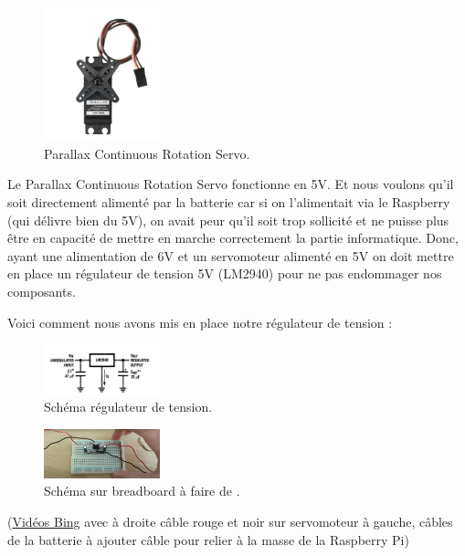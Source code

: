 \documentclass[a4paper,12pt]{report}  %
\begin{document}
\begin{figure}[H]
	\centering
	\includegraphics[width=0.3\textwidth]{./attachments/moteur_rotation.jpg}
	\caption{Parallax Continuous Rotation Servo.}
\end{figure}

Le Parallax Continuous Rotation Servo fonctionne en 5V. Et nous voulons qu’il soit directement alimenté par la batterie car si on l'alimentait via le Raspberry (qui délivre bien du 5V), on avait peur qu’il soit trop sollicité et ne puisse plus être en capacité de mettre en marche correctement la partie informatique.
Donc, ayant une alimentation de 6V et un servomoteur alimenté en 5V on doit mettre en place un régulateur de tension 5V (LM2940) pour ne pas endommager nos composants.

Voici comment nous avons mis en place notre régulateur de tension : 
\begin{figure}[H]
	\centering
	\includegraphics[width=0.3\textwidth]{./attachments/regulateur_schema.jpg}
	\caption{Schéma régulateur de tension.}
\end{figure}

\begin{figure}[H]
	\centering
	\includegraphics[width=0.3\textwidth]{./attachments/regulateur_breadboard.jpg}
	\caption{Schéma sur breadboard à faire de .}
\end{figure}

(\href{https://www.bing.com/videos/riverview/relatedvideo?&q=regulador+de+5voltios+L7805&&mid=4E46E731ADB08757CF134E46E731ADB08757CF13&mmscn=mtsc&aps=13&FORM=VRDGAR}{Vidéos Bing} 
avec à droite câble rouge et noir sur servomoteur
à  gauche, câbles de la batterie 
à ajouter câble pour relier à la masse de la Raspberry Pi)
\end{document}
